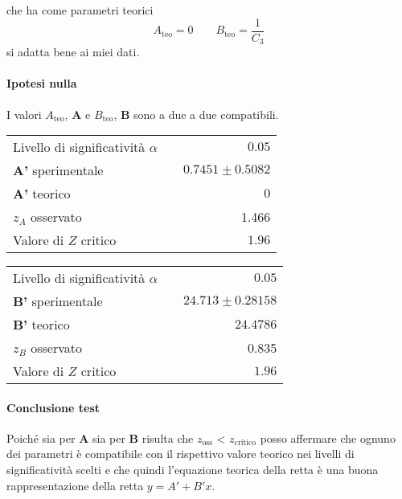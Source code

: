 \documentclass{article}
\begin{document}
	che ha come parametri teorici
	\[
	A_\text{teo} = 0 \qquad B_\text{teo} =  \frac{1}{C_3}
	\]
	si adatta bene ai miei dati. 
	
	\paragraph{Ipotesi nulla} I valori $A_{\text{teo}}$, $\mathbf{A}$ e  $B_{\text{teo}}$, $\mathbf{B}$ sono a due a due compatibili.
	
	\vspace{0.7cm}
	\begin{minipage}{0.5\textwidth}
		\begin{table}[H]
			\centering
			\begin{tabular}{lr} 
				Livello di significatività $\alpha$		&$\quad 0.05$  \\
				\textbf{A'} sperimentale				& $\quad0.7451 \pm 0.5082 $\\
				\textbf{A'} teorico					&  $\quad0$ \\
				$z_{A}$ osservato 					& $\quad$ 1.466 \\
				Valore di $Z$ critico     	& $\quad 1.96$
			\end{tabular}
		\end{table}
	\end{minipage}
	\begin{minipage}{0.5\textwidth}
		\begin{table}[H]
			\centering
			\begin{tabular}{lr} 
				Livello di significatività $\alpha$		&$\quad 0.05$  \\
				\textbf{B'} sperimentale				& $\quad 24.713 \pm  0.28158$	\\
				\textbf{B'} teorico					& $\quad 24.4786$ \\
				$z_{B}$ osservato 					& $\quad$ 0.835 \\
				Valore di $Z$ critico     	& $\quad 1.96$
			\end{tabular}
		\end{table}
	\end{minipage}
	\vspace{0.7cm}
	
	\paragraph{Conclusione test} Poiché sia per $\mathbf{A}$ sia per $\mathbf{B}$ risulta che $z_{\text{oss}}$ < $z_{\text{critico}}$ posso affermare che ognuno dei parametri  è compatibile con il rispettivo valore teorico nei livelli di significatività scelti e che quindi l'equazione teorica della retta è una buona rappresentazione della retta $y=A' + B'x$.\\
	
\end{document}
